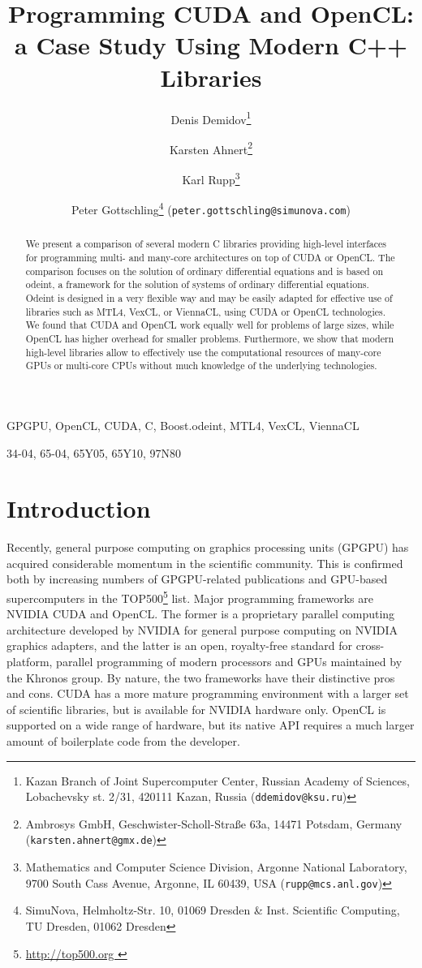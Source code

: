 \documentclass[final]{siamltex}
\title{Programming CUDA and OpenCL:\\a Case Study Using Modern C++ Libraries}
\author{
Denis Demidov\thanks{
Kazan Branch of Joint Supercomputer Center,
Russian Academy of Sciences,
Lobachevsky st. 2/31, 420111 Kazan, Russia
({\tt ddemidov@ksu.ru}) }
\and Karsten Ahnert\thanks{Ambrosys GmbH, Geschwister-Scholl-Stra\ss e 63a, 14471 Potsdam, Germany ({\tt karsten.ahnert@gmx.de}) }
\and Karl Rupp\thanks{Mathematics and Computer Science Division,
Argonne National Laboratory,
9700 South Cass Avenue, Argonne, IL 60439, USA
({\tt rupp@mcs.anl.gov}) }
\and Peter Gottschling\thanks{SimuNova, Helmholtz-Str. 10, 01069 Dresden \&
Inst. Scientific Computing, TU Dresden, 01062 Dresden}
({\tt peter.gottschling@simunova.com}) }
\newcommand{\addpp}[1]{{#1\nolinebreak[4]\hspace{-.05em}\raisebox{.4ex}{\tiny\bf ++}}\xspace}
\newcommand{\Cpp}{\addpp{C}}
\begin{document}
\maketitle

\begin{abstract}
    We present a comparison of several modern \Cpp libraries providing high-level interfaces
    for programming multi- and many-core architectures on top of CUDA or OpenCL.
    The comparison focuses on the solution of ordinary differential equations and is based on odeint,
    a framework for the solution of systems of ordinary differential equations. Odeint is designed in a
    very flexible way and may be easily adapted for effective use of libraries such
    as MTL4, VexCL, or ViennaCL, using CUDA or OpenCL technologies.
    We found that CUDA and OpenCL work equally well for problems
    of large sizes, while OpenCL has higher overhead for smaller problems.
    Furthermore, we show that modern high-level libraries allow to effectively
    use the computational resources of many-core GPUs or multi-core CPUs without much
    knowledge of the underlying technologies.
\end{abstract}

\begin{keywords}
    GPGPU, OpenCL, CUDA, \Cpp, Boost.odeint, MTL4, VexCL, ViennaCL
\end{keywords}

\begin{AMS}
    34-04, 65-04, 65Y05, 65Y10, 97N80
\end{AMS}


%
%
\section{Introduction}

\pagestyle{myheadings}

\thispagestyle{plain}


Recently, general purpose computing on graphics processing units (GPGPU) has
acquired considerable momentum in the scientific community. This is confirmed
both by increasing numbers of GPGPU-related publications and GPU-based
supercomputers in the TOP500\footnote{ \href{ http://top500.org }{
http://top500.org }} list. Major programming frameworks are NVIDIA CUDA and
OpenCL.
The former is a proprietary parallel computing architecture developed
by NVIDIA for general purpose computing on NVIDIA graphics adapters, and the
latter is an open, royalty-free standard for cross-platform, parallel
programming of modern processors and GPUs maintained by the Khronos group. By
nature, the two frameworks have their distinctive pros and cons. CUDA has a
more mature programming environment with a larger set of scientific libraries,
but is available for NVIDIA hardware only. OpenCL is supported on a wide range
of hardware, but its native API requires a much larger amount of boilerplate
code from the developer.
\end{document}
